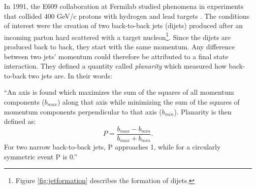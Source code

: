 In 1991, the E609 collaboration at Fermilab studied phenomena in experiments that collided 400 GeV/c protons with hydrogen and lead targets \citep{Corcoran:1990vq}. The conditions of interest were the creation of two back-to-back jets (dijets) produced after an incoming parton hard scattered with a target nucleon\footnote{Figure \ref{fig:jetformation} describes the formation of dijets.}. Since the dijets are produced back to back, they start with the same momentum. Any difference between two jets' momentum could therefore be attributed to a final state interaction. They defined a quantity called \textit{planarity} which measured how back-to-back two jets are. In their words:
\begin{addmargin}[1.5em]{2em}
``An axis is found which maximizes the sum of the squares of all momentum components ($b_{max}$) along that axis while minimizing the sum of the squares of momentum components perpendicular to that axis ($b_{min}$). Planarity is then defined as: 
\begin{equation}
P = \frac{b_{max}-b_{min}}{b_{max}+b_{min}}.
\end{equation}
For two narrow back-to-back jets, P approaches 1, while for a circularly symmetric event P is 0.''
\end{addmargin}

